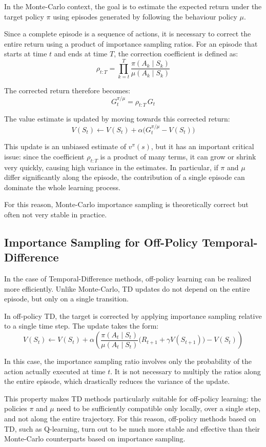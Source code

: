 In the Monte-Carlo context, the goal is to estimate the expected return under the target policy $\pi$ using episodes generated by following the behaviour policy $\mu$.

Since a complete episode is a sequence of actions, it is necessary to correct the entire return using a product of importance sampling ratios. For an episode that starts at time $t$ and ends at time $T$, the correction coefficient is defined as:
\[
\rho_{t:T}
=
\prod_{k=t}^{T}
\frac{\pi(A_k \mid S_k)}{\mu(A_k \mid S_k)}
\]

The corrected return therefore becomes:
\[
G_t^{\pi/\mu} = \rho_{t:T} \, G_t
\]

The value estimate is updated by moving towards this corrected return:
\[
V(S_t)
\leftarrow
V(S_t) + \alpha
\bigl(
G_t^{\pi/\mu} - V(S_t)
\bigr)
\]

This update is an unbiased estimate of $v^\pi(s)$, but it has an important critical issue: since the coefficient $\rho_{t:T}$ is a product of many terms, it can grow or shrink very quickly, causing high variance in the estimates. In particular, if $\pi$ and $\mu$ differ significantly along the episode, the contribution of a single episode can dominate the whole learning process.

For this reason, Monte-Carlo importance sampling is theoretically correct but often not very stable in practice.


\subsection{Importance Sampling for Off-Policy Temporal-Difference}

In the case of Temporal-Difference methods, off-policy learning can be realized more efficiently. Unlike Monte-Carlo, TD updates do not depend on the entire episode, but only on a single transition.

In off-policy TD, the target is corrected by applying importance sampling relative to a single time step. The update takes the form:
\[
V(S_t)
\leftarrow
V(S_t)
+
\alpha
\left(
\frac{\pi(A_t \mid S_t)}{\mu(A_t \mid S_t)}
\bigl(
R_{t+1} + \gamma V(S_{t+1})
\bigr)
-
V(S_t)
\right)
\]

In this case, the importance sampling ratio involves only the probability of the action actually executed at time $t$. It is not necessary to multiply the ratios along the entire episode, which drastically reduces the variance of the update.

This property makes TD methods particularly suitable for off-policy learning: the policies $\pi$ and $\mu$ need to be sufficiently compatible only locally, over a single step, and not along the entire trajectory. For this reason, off-policy methods based on TD, such as Q-learning, turn out to be much more stable and effective than their Monte-Carlo counterparts based on importance sampling.


